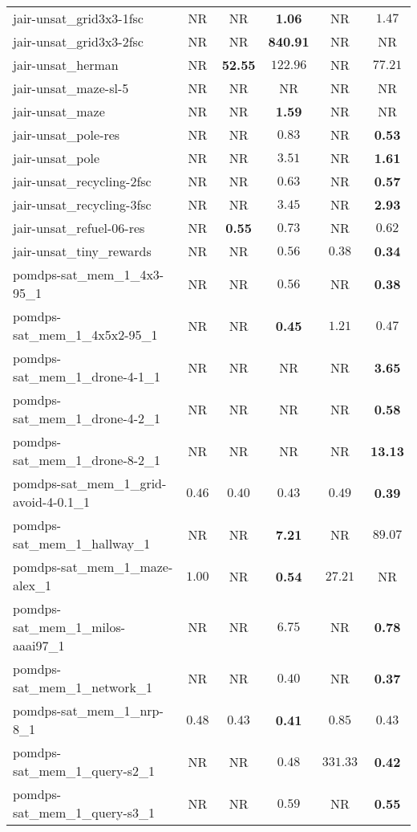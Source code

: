 \begin{tabular}{lccccc}
jair-unsat\_grid3x3-1fsc & NR & NR & \textbf{1.06} & NR & $1.47$ \\
jair-unsat\_grid3x3-2fsc & NR & NR & \textbf{840.91} & NR & NR \\
jair-unsat\_herman & NR & \textbf{52.55} & $122.96$ & NR & $77.21$ \\
jair-unsat\_maze-sl-5 & NR & NR & NR & NR & NR \\
jair-unsat\_maze & NR & NR & \textbf{1.59} & NR & NR \\
jair-unsat\_pole-res & NR & NR & $0.83$ & NR & \textbf{0.53} \\
jair-unsat\_pole & NR & NR & $3.51$ & NR & \textbf{1.61} \\
jair-unsat\_recycling-2fsc & NR & NR & $0.63$ & NR & \textbf{0.57} \\
jair-unsat\_recycling-3fsc & NR & NR & $3.45$ & NR & \textbf{2.93} \\
jair-unsat\_refuel-06-res & NR & \textbf{0.55} & $0.73$ & NR & $0.62$ \\
jair-unsat\_tiny\_rewards & NR & NR & $0.56$ & $0.38$ & \textbf{0.34} \\
pomdps-sat\_mem\_1\_4x3-95\_1 & NR & NR & $0.56$ & NR & \textbf{0.38} \\
pomdps-sat\_mem\_1\_4x5x2-95\_1 & NR & NR & \textbf{0.45} & $1.21$ & $0.47$ \\
pomdps-sat\_mem\_1\_drone-4-1\_1 & NR & NR & NR & NR & \textbf{3.65} \\
pomdps-sat\_mem\_1\_drone-4-2\_1 & NR & NR & NR & NR & \textbf{0.58} \\
pomdps-sat\_mem\_1\_drone-8-2\_1 & NR & NR & NR & NR & \textbf{13.13} \\
pomdps-sat\_mem\_1\_grid-avoid-4-0.1\_1 & $0.46$ & $0.40$ & $0.43$ & $0.49$ & \textbf{0.39} \\
pomdps-sat\_mem\_1\_hallway\_1 & NR & NR & \textbf{7.21} & NR & $89.07$ \\
pomdps-sat\_mem\_1\_maze-alex\_1 & $1.00$ & NR & \textbf{0.54} & $27.21$ & NR \\
pomdps-sat\_mem\_1\_milos-aaai97\_1 & NR & NR & $6.75$ & NR & \textbf{0.78} \\
pomdps-sat\_mem\_1\_network\_1 & NR & NR & $0.40$ & NR & \textbf{0.37} \\
pomdps-sat\_mem\_1\_nrp-8\_1 & $0.48$ & $0.43$ & \textbf{0.41} & $0.85$ & $0.43$ \\
pomdps-sat\_mem\_1\_query-s2\_1 & NR & NR & $0.48$ & $331.33$ & \textbf{0.42} \\
pomdps-sat\_mem\_1\_query-s3\_1 & NR & NR & $0.59$ & NR & \textbf{0.55} \\

\end{tabular}
